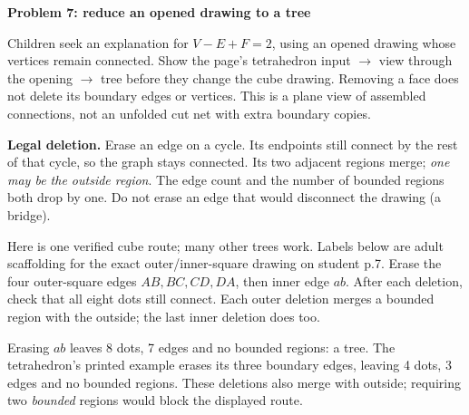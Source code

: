 \documentclass[11pt,letterpaper]{article}
\newcommand{\titleline}[1]{\par{\Large\bfseries #1}\par\vspace{4pt}}
\newcommand{\sub}[1]{\par\vspace{3pt}{\bfseries #1}\par}
\begin{document}
\newpage
\titleline{Problem 7: reduce an opened drawing to a tree}
\sub{Student p.7 / Grades 4--5 continuation}
Children seek an explanation for $V-E+F=2$, using an opened drawing whose vertices remain connected. Show the page's tetrahedron input $\rightarrow$ view through the opening $\rightarrow$ tree before they change the cube drawing. Removing a face does not delete its boundary edges or vertices. This is a plane view of assembled connections, not an unfolded cut net with extra boundary copies.

\textbf{Legal deletion.} Erase an edge on a cycle. Its endpoints still connect by the rest of that cycle, so the graph stays connected. Its two adjacent regions merge; \emph{one may be the outside region}. The edge count and the number of bounded regions both drop by one. Do not erase an edge that would disconnect the drawing (a bridge).

Here is one verified cube route; many other trees work. Labels below are adult scaffolding for the exact outer/inner-square drawing on student p.7. Erase the four outer-square edges $AB,BC,CD,DA$, then inner edge $ab$. After each deletion, check that all eight dots still connect. Each outer deletion merges a bounded region with the outside; the last inner deletion does too.

\begin{center}
\end{center}
Erasing $ab$ leaves 8 dots, 7 edges and no bounded regions: a tree. The tetrahedron's printed example erases its three boundary edges, leaving 4 dots, 3 edges and no bounded regions. These deletions also merge with outside; requiring two \emph{bounded} regions would block the displayed route.
\end{document}
